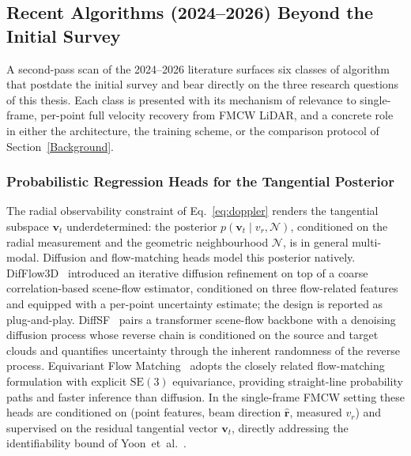 
\subsection{Recent Algorithms (2024--2026) Beyond the Initial Survey}
\label{sec:new_algorithms}

A second-pass scan of the 2024--2026 literature surfaces six classes of algorithm that postdate the initial survey and bear directly on the three research questions of this thesis. Each class is presented with its mechanism of relevance to single-frame, per-point full velocity recovery from FMCW LiDAR, and a concrete role in either the architecture, the training scheme, or the comparison protocol of Section~\ref{Background}.

\subsubsection{Probabilistic Regression Heads for the Tangential Posterior}
\label{sec:new_algorithms:diffusion}

The radial observability constraint of Eq.~\eqref{eq:doppler} renders the tangential subspace $\mathbf{v}_t$ underdetermined: the posterior $p(\mathbf{v}_t \mid v_r, \mathcal{N})$, conditioned on the radial measurement and the geometric neighbourhood $\mathcal{N}$, is in general multi-modal. Diffusion and flow-matching heads model this posterior natively. DifFlow3D~\cite{liu2024difflow3d} introduced an iterative diffusion refinement on top of a coarse correlation-based scene-flow estimator, conditioned on three flow-related features and equipped with a per-point uncertainty estimate; the design is reported as plug-and-play. DiffSF~\cite{zhang2024diffsf} pairs a transformer scene-flow backbone with a denoising diffusion process whose reverse chain is conditioned on the source and target clouds and quantifies uncertainty through the inherent randomness of the reverse process. Equivariant Flow Matching~\cite{wang2025eqflowmatching} adopts the closely related flow-matching formulation with explicit $\mathrm{SE}(3)$ equivariance, providing straight-line probability paths and faster inference than diffusion. In the single-frame FMCW setting these heads are conditioned on (point features, beam direction $\hat{\mathbf{r}}$, measured $v_r$) and supervised on the residual tangential vector $\mathbf{v}_t$, directly addressing the identifiability bound of Yoon~et~al.~\cite{yoon2023needforspeed}.

